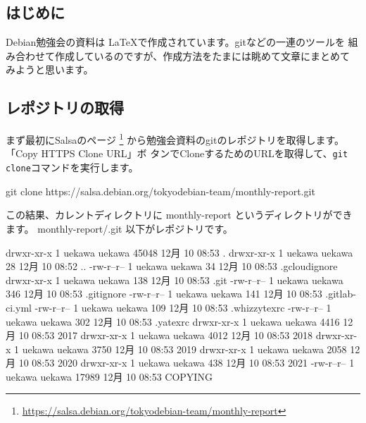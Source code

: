 \documentclass[mingoth,a4paper]{jsarticle}
\begin{document}
%
%
%
%




\label{sec:debmtg2020howtoprepare}

\subsection{はじめに}

Debian勉強会の資料は \LaTeX で作成されています。gitなどの一連のツールを
組み合わせて作成しているのですが、作成方法をたまには眺めて文章にまとめて
みようと思います。

\subsection{レポジトリの取得}

まず最初にSalsaのページ
\footnote{\url{https://salsa.debian.org/tokyodebian-team/monthly-report}}
から勉強会資料のgitのレポジトリを取得します。「Copy HTTPS Clone URL」ボ
タンでCloneするためのURLを取得して、\texttt{git clone}コマンドを実行します。

\begin{commandline}
 git clone https://salsa.debian.org/tokyodebian-team/monthly-report.git
\end{commandline}

この結果、カレントディレクトリに monthly-report というディレクトリができ
ます。
monthly-report/.git 以下がレポジトリです。

\begin{commandline}
drwxr-xr-x 1 uekawa uekawa  45048 12月 10 08:53 .
drwxr-xr-x 1 uekawa uekawa     28 12月 10 08:52 ..
-rw-r--r-- 1 uekawa uekawa     34 12月 10 08:53 .gcloudignore
drwxr-xr-x 1 uekawa uekawa    138 12月 10 08:53 .git
-rw-r--r-- 1 uekawa uekawa    346 12月 10 08:53 .gitignore
-rw-r--r-- 1 uekawa uekawa    141 12月 10 08:53 .gitlab-ci.yml
-rw-r--r-- 1 uekawa uekawa    109 12月 10 08:53 .whizzytexrc
-rw-r--r-- 1 uekawa uekawa    302 12月 10 08:53 .yatexrc
drwxr-xr-x 1 uekawa uekawa   4416 12月 10 08:53 2017
drwxr-xr-x 1 uekawa uekawa   4012 12月 10 08:53 2018
drwxr-xr-x 1 uekawa uekawa   3750 12月 10 08:53 2019
drwxr-xr-x 1 uekawa uekawa   2058 12月 10 08:53 2020
drwxr-xr-x 1 uekawa uekawa    438 12月 10 08:53 2021
-rw-r--r-- 1 uekawa uekawa  17989 12月 10 08:53 COPYING
\end{commandline}
\end{document}
